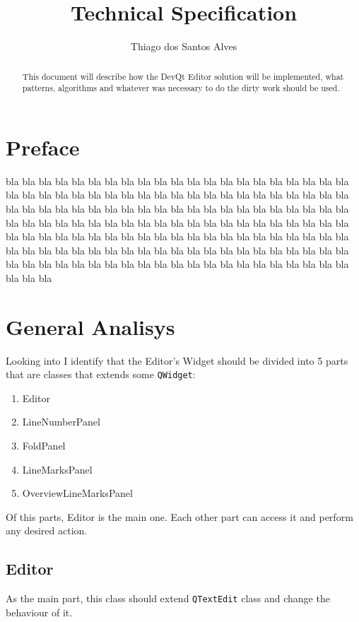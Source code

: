 \documentclass[11pt,a4paper]{report}
\author{Thiago dos Santos Alves}
\title{Technical Specification}
\begin{document}
\maketitle
\tableofcontents
\listoffigures

\begin{abstract}
This document will describe how the DevQt Editor solution will be implemented, what patterns, algorithms and whatever was necessary to do the dirty work should be used.
\end{abstract}

\chapter*{Preface}
bla bla bla bla bla bla bla bla bla bla bla bla bla bla bla 
bla bla bla bla bla bla bla bla bla bla bla bla bla bla bla 
bla bla bla bla bla bla bla bla bla bla bla bla bla bla bla 
bla bla bla bla bla bla bla bla bla bla bla bla bla bla bla 
bla bla bla bla bla bla bla bla bla bla bla bla bla bla bla 
bla bla bla bla bla bla bla bla bla bla bla bla bla bla bla 
bla bla bla bla bla bla bla bla bla bla bla bla bla bla bla 
bla bla bla bla bla bla bla bla bla bla bla bla bla bla bla 
bla bla bla bla bla bla bla bla bla bla bla bla bla bla bla 
bla bla bla bla bla bla bla bla bla bla bla bla bla bla bla 

\chapter{General Analisys} \label{generalAnalisys}
Looking into \cite{functional} I identify that the Editor's Widget should be divided into 5 parts that are classes that extends some \texttt{QWidget}:

\begin{enumerate}
\item Editor
\item LineNumberPanel
\item FoldPanel
\item LineMarksPanel
\item OverviewLineMarksPanel
\end{enumerate}

Of this parts, Editor is the main one. Each other part can access it and perform any desired action.

\section{Editor} \label{overviewEditor}
As the main part, this class should extend \texttt{QTextEdit} class and change the behaviour of it.
\end{document}
